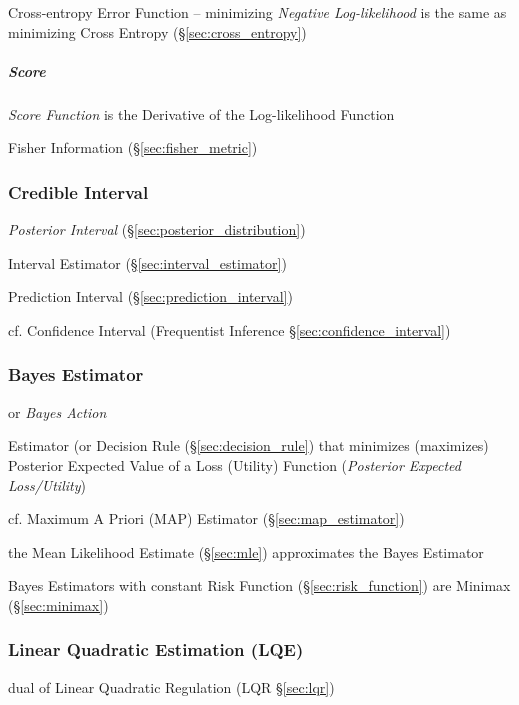 \fist Cross-entropy Error Function -- minimizing \emph{Negative Log-likelihood}
is the same as minimizing Cross Entropy (\S\ref{sec:cross_entropy})



\subparagraph{Score}\label{sec:score}\hfill

\emph{Score Function} is the Derivative of the Log-likelihood Function

\fist Fisher Information (\S\ref{sec:fisher_metric})



\subsubsection{Credible Interval}\label{sec:credible_interval}

\emph{Posterior Interval} (\S\ref{sec:posterior_distribution})

Interval Estimator (\S\ref{sec:interval_estimator})

Prediction Interval (\S\ref{sec:prediction_interval})

cf. Confidence Interval (Frequentist Inference \S\ref{sec:confidence_interval})



\subsubsection{Bayes Estimator}\label{sec:bayes_estimator}\hfill

or \emph{Bayes Action}

Estimator (or Decision Rule (\S\ref{sec:decision_rule}) that minimizes
(maximizes) Posterior Expected Value of a Loss (Utility) Function
(\emph{Posterior Expected Loss/Utility})

cf. Maximum A Priori (MAP) Estimator (\S\ref{sec:map_estimator})

the Mean Likelihood Estimate (\S\ref{sec:mle}) approximates the Bayes Estimator

Bayes Estimators with constant Risk Function (\S\ref{sec:risk_function}) are
Minimax (\S\ref{sec:minimax})



\subsubsection{Linear Quadratic Estimation (LQE)}\label{sec:lqe}

dual of Linear Quadratic Regulation (LQR \S\ref{sec:lqr})

